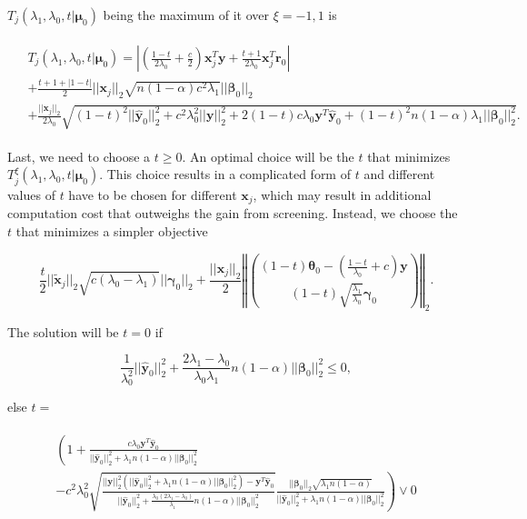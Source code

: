 $T_j(\lambda_1,\lambda_0,t|\boldsymbol\mu_0)$ being the maximum of it over $\xi=-1,1$ is

\begin{gather}
    \label{eq:t}
    \begin{aligned}
        &T_j(\lambda_1,\lambda_0,t|\boldsymbol\mu_0)= \left| \left(\frac{1-t}{2\lambda_0}+\frac{c}{2}\right)\boldsymbol x_j^T \boldsymbol y+\frac{t+1}{2\lambda_0} \boldsymbol x_j^T \boldsymbol r_{0}\right|\\
        &+\frac{t+1+|1-t|}{2}||\boldsymbol x_j||_2\sqrt{n(1-\alpha) c^2\lambda_1}||\boldsymbol\beta_{0}||_2\\
        &+\frac{||\boldsymbol x_j||_2}{2\lambda_0}\sqrt{(1-t)^2||\hat{\boldsymbol y}_{0}||_2^2+c^2\lambda_0^2||\boldsymbol y||_2^2+2(1-t)c\lambda_0 \boldsymbol y^T\hat{\boldsymbol y}_{0}+(1-t)^2n(1-\alpha)\lambda_1||\boldsymbol\beta_{0}||_2^2}.
    \end{aligned}
\end{gather}

Last, we need to choose a $t\geq 0$. An optimal choice will be the $t$ that minimizes $T^\xi_j(\lambda_1,\lambda_0,t|\boldsymbol\mu_0)$. This choice results in a complicated form of $t$ and different values of $t$ have to be chosen for different $\boldsymbol x_j$, which may result in additional computation cost that outweighs the gain from screening. Instead, we choose the $t$ that minimizes a simpler objective

\begin{equation}
    \frac{t}{2}||\tilde{\boldsymbol x}_j||_2\sqrt{c(\lambda_0-\lambda_1)}||\boldsymbol\gamma_{0}||_2+\frac{||\boldsymbol x_j||_2}{2}\left\Vert\binom{(1-t)\boldsymbol\theta_{0}-\left(\frac{1-t}{\lambda_0}+c\right)\boldsymbol y}{(1-t)\sqrt{\frac{\lambda_1}{\lambda_0}}\boldsymbol\gamma_{0}}\right\Vert_2.
\end{equation}

The solution will be $t=0$ if

\begin{equation}
    \label{eq:t0}
    \frac{1}{\lambda_0^2}||\hat{\boldsymbol y}_{0}||_2^2+\frac{2\lambda_1-\lambda_0}{\lambda_0\lambda_1}n(1-\alpha)||\boldsymbol\beta_{0}||_2^2\leq 0,
\end{equation}

else $t=$

\begin{align}
    \label{eq:tn0}
    \begin{gathered}
        \left(1+\frac{c\lambda_0\boldsymbol y^T\hat{\boldsymbol y}_{0}}{||\hat{\boldsymbol y}_{0}||_2^2+\lambda_1n(1-\alpha)||\boldsymbol\beta_{0}||_2^2}\right.\\
        \left.-c^2\lambda_0^2\sqrt{\frac{||\boldsymbol y||_2^2\left(||\hat{\boldsymbol y}_{0}||_2^2+\lambda_1n(1-\alpha)||\boldsymbol\beta_{0}||_2^2\right)-\boldsymbol y^T\hat{\boldsymbol y}_{0}}{||\hat{\boldsymbol y}_{0}||_2^2+\frac{\lambda_0(2\lambda_1-\lambda_0)}{\lambda_1}n(1-\alpha)||\boldsymbol\beta_{0}||_2^2}}
        \frac{||\boldsymbol\beta_{0}||_2\sqrt{\lambda_1n(1-\alpha)}}{||\hat{\boldsymbol y}_{0}||_2^2+\lambda_1n(1-\alpha)||\boldsymbol\beta_{0}||_2^2}\right)\vee0
    \end{gathered}
\end{align}

